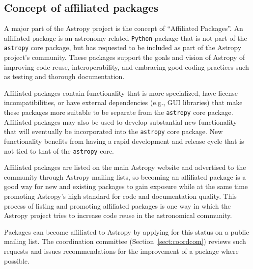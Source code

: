 \documentclass[modern]{aastex61}
\newcommand{\package}[1]{\texttt{#1}\xspace}
\newcommand{\python}{\package{Python}}
\newcommand{\astropy}{Astropy\xspace}
\newcommand{\astropypkg}{\package{astropy}}
\newcommand{\sectionname}{Section\xspace}
\begin{document}
\subsection{Concept of affiliated packages}

A major part of the \astropy project is the concept of
``Affiliated Packages''. An affiliated package is an astronomy-related
\python package that is not part of the \astropypkg core package, but
has requested to be included as part of the \astropy project's
community. These packages support the goals and vision of \astropy of
improving code reuse, interoperability, and embracing good coding
practices such as testing and thorough documentation.

Affiliated packages contain functionality that is more specialized,
have license incompatibilities, or have external dependencies (e.g., GUI
libraries) that make these packages more suitable to be separate from the
\astropypkg core package.
Affiliated packages may also be used to develop substantial new functionality
that will eventually be incorporated into the \astropypkg core package.
New functionality benefits from having a rapid development and release cycle that is not tied to that of the \astropypkg core.

Affiliated packages are listed on the main \astropy website and advertised to the community through \astropy mailing lists, so becoming an affiliated package is a good way for new and existing packages to gain exposure while at the same time promoting \astropy's high standard for code and documentation quality. This process of listing and promoting affiliated packages is one way in which the \astropy project tries to increase code reuse in the astronomical community.

Packages can become affiliated to \astropy by applying for this status on a public mailing list. The coordination committee (\sectionname~\ref{sect:coordcom}) reviews such requests and issues recommendations for the improvement of a package where possible.

\end{document}
